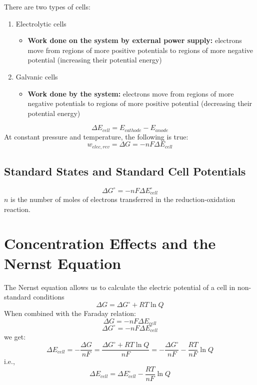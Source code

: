 \documentclass[10pt]{article}
\begin{document}
There are two types of cells:
\begin{enumerate}
    \item Electrolytic cells
    \begin{itemize}
        \item \textbf{Work done on the system by external power supply:} electrons move from regions of more positive potentials to regions of more negative potential (increasing their potential energy)
    \end{itemize}
    \item Galvanic cells
    \begin{itemize}
        \item \textbf{Work done by the system:} electrons move from regions of more negative potentials to regions of more positive potential (decreasing their potential energy)
    \end{itemize}
\end{enumerate}


\[\Delta E_{cell} = E_{cathode} - E_{anode}\]
At constant pressure and temperature, the following is true:
\[w_{elec, rev} = \Delta G = -nF\Delta E_{cell}\]

\subsection*{Standard States and Standard Cell Potentials}
\[\Delta G^\circ = -nF\Delta E_{cell}^\circ\]
$n$ is the number of moles of electrons transferred in the reduction-oxidation reaction.


\section*{Concentration Effects and the Nernst Equation}
The Nernst equation allows us to calculate the electric potential of a cell in non-standard conditions
\[\Delta G = \Delta G^\circ + RT \ln Q\]
When combined with the Faraday relation:
\[\Delta G = -n F\Delta E_{cell}\]
\[\Delta G^\circ = -nF\Delta E_{cell}^\circ\]
we get:
\[\Delta E_{cell} = -\frac{\Delta G}{nF} = \frac{\Delta G^\circ + RT\ln Q}{nF} = -\frac{\Delta G^\circ}{nF} - \frac{RT}{nF} \ln Q\]
i.e.,
\[\Delta E_{cell} = \Delta E_{cell}^\circ - \frac{RT}{nF}\ln Q\]
\end{document}
